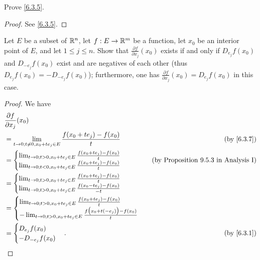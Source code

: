 \exercisesection

\begin{ex}\label{ex:6.3.1}
  Prove \cref{6.3.5}.
\end{ex}

\begin{proof}
  See \cref{6.3.5}.
\end{proof}

\begin{ex}\label{ex:6.3.2}
  Let \(E\) be a subset of \(\mathbb{R}^n\), let \(f : E \to \mathbb{R}^m\) be a function, let \(x_0\) be an interior point of \(E\), and let \(1 \leq j \leq n\).
  Show that \(\frac{\partial f}{\partial x_j}(x_0)\) exists if and only if \(D_{e_j} f(x_0)\) and \(D_{-e_j} f(x_0)\) exist and are negatives of each other
  (thus \(D_{e_j} f(x_0) = -D_{-e_j} f(x_0)\));
  furthermore, one has \(\frac{\partial f}{\partial x_j}(x_0) = D_{e_j} f(x_0)\) in this case.
\end{ex}

\begin{proof}
  We have
  \begin{align*}
     & \frac{\partial f}{\partial x_j}(x_0)                                                                               \\
     & = \lim_{t \to 0 ; t \neq 0, x_0 + t e_j \in E} \frac{f(x_0 + t e_j) - f(x_0)}{t}        & \text{(by \cref{6.3.7})} \\
     & = \begin{cases}
           \lim_{t \to 0 ; t > 0, x_0 + t e_j \in E} \frac{f(x_0 + t e_j) - f(x_0)}{t} \\
           \lim_{t \to 0 ; t < 0, x_0 + t e_j \in E} \frac{f(x_0 + t e_j) - f(x_0)}{t}
         \end{cases}          & \text{(by Proposition 9.5.3 in Analysis I)}                                      \\
     & = \begin{cases}
           \lim_{t \to 0 ; t > 0, x_0 + t e_j \in E} \frac{f(x_0 + t e_j) - f(x_0)}{t} \\
           \lim_{t \to 0 ; t > 0, x_0 + t e_j \in E} \frac{f(x_0 - t e_j) - f(x_0)}{-t}
         \end{cases}                                      \\
     & = \begin{cases}
           \lim_{t \to 0 ; t > 0, x_0 + t e_j \in E} \frac{f(x_0 + t e_j) - f(x_0)}{t} \\
           -\lim_{t \to 0 ; t > 0, x_0 + t e_j \in E} \frac{f\big(x_0 + t (-e_j)\big) - f(x_0)}{t}
         \end{cases}                           \\
     & = \begin{cases}
           D_{e_j} f(x_0) \\
           - D_{-e_j} f(x_0)
         \end{cases}.                                                                       & \text{(by \cref{6.3.1})}
  \end{align*}
\end{proof}

